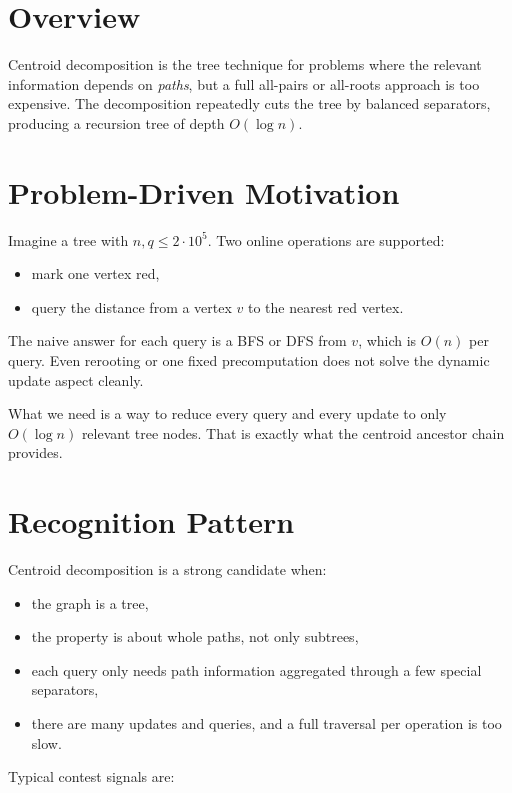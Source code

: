 \section*{Overview}

Centroid decomposition is the tree technique for problems where the relevant information depends on \emph{paths}, but a
full all-pairs or all-roots approach is too expensive. The decomposition repeatedly cuts the tree by balanced
separators, producing a recursion tree of depth \(O(\log n)\).

\section*{Problem-Driven Motivation}

Imagine a tree with \(n,q \le 2 \cdot 10^5\). Two online operations are supported:

\begin{itemize}
  \item mark one vertex red,
  \item query the distance from a vertex \(v\) to the nearest red vertex.
\end{itemize}

The naive answer for each query is a BFS or DFS from \(v\), which is \(O(n)\) per query. Even rerooting or one fixed
precomputation does not solve the dynamic update aspect cleanly.

What we need is a way to reduce every query and every update to only \(O(\log n)\) relevant tree nodes. That is exactly
what the centroid ancestor chain provides.

\section*{Recognition Pattern}

Centroid decomposition is a strong candidate when:

\begin{itemize}
  \item the graph is a tree,
  \item the property is about whole paths, not only subtrees,
  \item each query only needs path information aggregated through a few special separators,
  \item there are many updates and queries, and a full traversal per operation is too slow.
\end{itemize}

Typical contest signals are:

